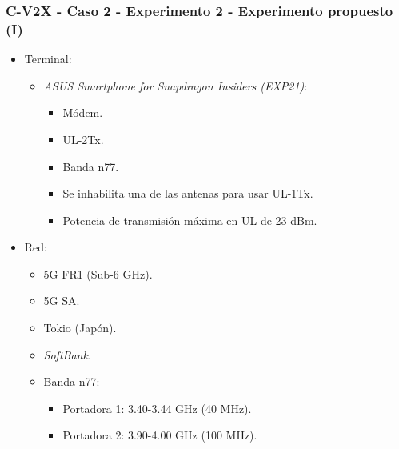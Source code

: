 \documentclass{beamer}
\begin{document}
\begin{frame}
\frametitle{C-V2X - Caso 2 - Experimento 2 - Experimento propuesto (I)}

\begin{itemize}
\item {
	Terminal:
	\begin{itemize}
	\item {
		\textit{ASUS Smartphone for Snapdragon Insiders (EXP21)}:
		\begin{itemize}
		\item Módem.
		\item UL-2Tx.
		\item Banda n77.
		\item Se inhabilita una de las antenas para usar UL-1Tx.
		\item Potencia de transmisión máxima en UL de 23 dBm.
		\end{itemize}
	}
	\end{itemize}
}
\item {
	Red:
	\begin{itemize}
	\item 5G FR1 (Sub-6 GHz).
	\item 5G SA.
	\item Tokio (Japón).
	\item \textit{SoftBank}.
	\item {
		Banda n77:
		\begin{itemize}
		\item Portadora 1: 3.40-3.44 GHz (40 MHz).
		\item Portadora 2: 3.90-4.00 GHz (100 MHz).
		\end{itemize}
	}
	\end{itemize}
}
\end{itemize}
\end{frame}
\end{document}
